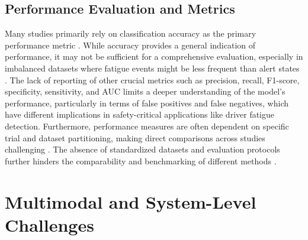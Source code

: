 \subsection{Performance Evaluation and Metrics}
Many studies primarily rely on classification accuracy as the primary performance metric \citep{Lins_I_2024, Yang_K_2024_1, Gao_Z_2020_2, Min_J_2018, Rashid_M_2021, Rahmatillah_O_2019, Foong_R_2019, Gu_T_2024, Hussein_R_2024}. While accuracy provides a general indication of performance, it may not be sufficient for a comprehensive evaluation, especially in imbalanced datasets where fatigue events might be less frequent than alert states \citep{Foong_R_2019, Liang_Y_2019, Gong_P_2024}.  The lack of reporting of other crucial metrics such as precision, recall, F1-score, specificity, sensitivity, and AUC \citep{Fu_R_2016, Gao_Z_2020_2, Min_J_2018, Ojha_D_2023, Rashid_M_2021, Rahmatillah_O_2019, Wang_F_2014, Luo_H_2019, Yang_H_2024, Gu_T_2024, Hussein_R_2024, Ramos_P_2022} limits a deeper understanding of the model's performance, particularly in terms of false positives and false negatives, which have different implications in safety-critical applications like driver fatigue detection.  Furthermore, performance measures are often dependent on specific trial and dataset partitioning, making direct comparisons across studies challenging \citep{Hong_S_2018, Mehreen_A_2019, Subasi_A_2022}.  The absence of standardized datasets and evaluation protocols further hinders the comparability and benchmarking of different methods \citep{Fu_R_2016, Majumder_S_2019, Mehreen_A_2019, Subasi_A_2022, Rahmatillah_O_2019, Ojha_D_2023}.

\section{Multimodal and System-Level Challenges}

